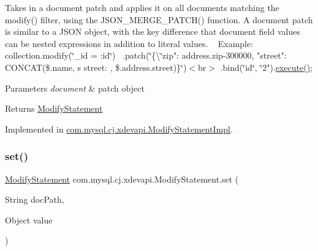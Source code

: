 Takes in a document patch and applies it on all documents matching the modify() filter, using the J\+S\+O\+N\+\_\+\+M\+E\+R\+G\+E\+\_\+\+P\+A\+T\+C\+H() function. A document patch is similar to a J\+S\+ON object, with the key difference that document field values can be nested expressions in addition to literal values. ~\newline
 Example\+:~\newline
 collection.\+modify(\char`\"{}\+\_\+id = \+:id\char`\"{})~\newline
 .patch(\char`\"{}\{\textbackslash{}\char`\"{}zip"\+: address.\+zip-\/300000, "street"\+: C\+O\+N\+C\+AT(\$.name, \textquotesingle{}\textquotesingle{}\textquotesingle{}s street\+: \textquotesingle{}, \$.address.\+street)\}\char`\"{})$<$br$>$
.\+bind(\char`\"{}id\char`\"{}, \char`\"{}2").\mbox{\hyperlink{interfacecom_1_1mysql_1_1cj_1_1xdevapi_1_1_statement_ae92dce50b119561fd532303ad491c610}{execute()}};


\begin{DoxyParams}{Parameters}
{\em document} & patch object \\
\hline
\end{DoxyParams}
\begin{DoxyReturn}{Returns}
\mbox{\hyperlink{interfacecom_1_1mysql_1_1cj_1_1xdevapi_1_1_modify_statement}{Modify\+Statement}} 
\end{DoxyReturn}


Implemented in \mbox{\hyperlink{classcom_1_1mysql_1_1cj_1_1xdevapi_1_1_modify_statement_impl_a67bbbca2a519b79e54c1957e4d2f7c92}{com.\+mysql.\+cj.\+xdevapi.\+Modify\+Statement\+Impl}}.

\mbox{\label{interfacecom_1_1mysql_1_1cj_1_1xdevapi_1_1_modify_statement_a224c3d0f2d2218a7d20ecb35ab48bccb}} 
\subsubsection{\texorpdfstring{set()}{set()}}
{\footnotesize\ttfamily \mbox{\hyperlink{interfacecom_1_1mysql_1_1cj_1_1xdevapi_1_1_modify_statement}{Modify\+Statement}} com.\+mysql.\+cj.\+xdevapi.\+Modify\+Statement.\+set (\begin{DoxyParamCaption}\item[{String}]{doc\+Path,  }\item[{Object}]{value }\end{DoxyParamCaption})}

